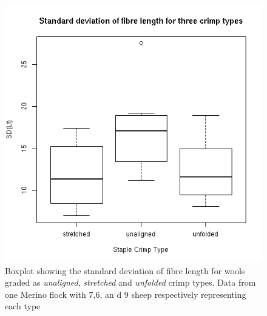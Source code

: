 %

\begin{figure}[!h]
  \centering
  \includegraphics[width=1.1\textwidth]{figsdlfbox.png}
  \caption{Boxplot showing the standard deviation of fibre length for wools graded as {\em unaligned}, {\em stretched} and {\em unfolded} crimp types. Data from one Merino flock with 7,6, an d 9 sheep respectively representing each type}
  \label{fig:sdlfbox}
\end{figure}

%


